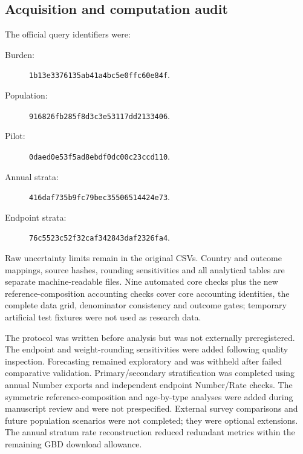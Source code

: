 \documentclass[11pt,a4paper]{article}
\begin{document}
\subsection{Acquisition and computation audit}
The official query identifiers were:
\begin{description}
\item[Burden:] \texttt{1b13e3376135ab41a4bc5e0ffc60e84f}.
\item[Population:] \texttt{916826fb285f8d3c3e53117dd2133406}.
\item[Pilot:] \texttt{0daed0e53f5ad8ebdf0dc00c23ccd110}.
\item[Annual strata:] \texttt{416daf735b9fc79bec35506514424e73}.
\item[Endpoint strata:] \texttt{76c5523c52f32caf342843daf2326fa4}.
\end{description}
Raw uncertainty limits remain in the original CSVs. Country and outcome mappings, source hashes, rounding sensitivities and all analytical tables are separate machine-readable files. Nine automated core checks plus the new reference-composition accounting checks cover core accounting identities, the complete data grid, denominator consistency and outcome gates; temporary artificial test fixtures were not used as research data.

The protocol was written before analysis but was not externally preregistered. The endpoint and weight-rounding sensitivities were added following quality inspection. Forecasting remained exploratory and was withheld after failed comparative validation. Primary/secondary stratification was completed using annual Number exports and independent endpoint Number/Rate checks. The symmetric reference-composition and age-by-type analyses were added during manuscript review and were not prespecified. External survey comparisons and future population scenarios were not completed; they were optional extensions. The annual stratum rate reconstruction reduced redundant metrics within the remaining GBD download allowance.
\end{document}
